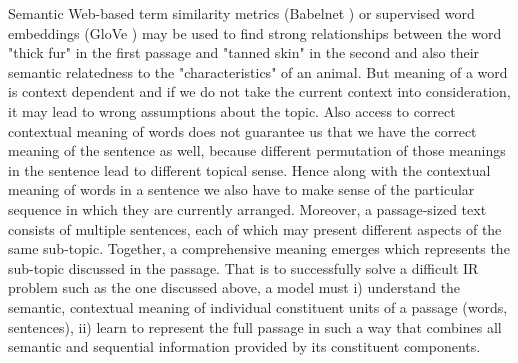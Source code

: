 Semantic Web-based term similarity metrics (Babelnet \cite{NavigliPonzetto:12aij}) or supervised word embeddings (GloVe \cite{pennington2014glove}) may be used to find strong relationships between the word "thick fur" in the first passage and "tanned skin" in the second and also their semantic relatedness to the "characteristics" of an animal. But meaning of a word is context dependent and if we do not take the current context into consideration, it may lead to wrong assumptions about the topic. Also access to correct contextual meaning of words does not guarantee us that we have the correct meaning of the sentence as well, because different permutation of those meanings in the sentence lead to different topical sense. Hence along with the contextual meaning of words in a sentence we also have to make sense of the particular sequence in which they are currently arranged. Moreover, a passage-sized text consists of multiple sentences, each of which may present different aspects of the same sub-topic. Together, a comprehensive meaning emerges which represents the sub-topic discussed in the passage. That is to successfully solve a difficult IR problem such as the one discussed above, a model must i) understand the semantic, contextual meaning of individual constituent units of a passage (words, sentences), ii) learn to represent the full passage in such a way that combines all semantic and sequential information provided by its constituent components.

